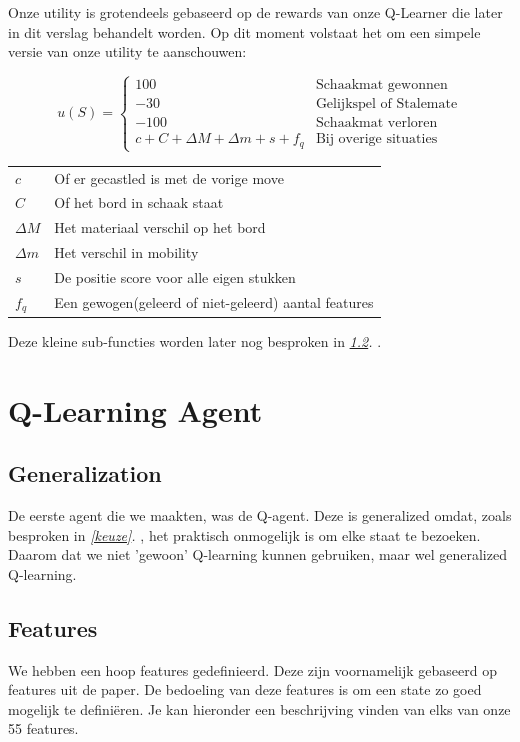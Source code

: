 \documentclass[a4paper,openany]{uantwerpenassignment}
\makeatletter
\newenvironment{conditions}
  {\par\vspace{\abovedisplayskip}\noindent\begin{tabular}{>{$}l<{$} @{${}={}$} l}}
  {\end{tabular}\par\vspace{\belowdisplayskip}}
\newcommand{\reference}[1]{\textit{\ref{#1}. \nameref{#1}}}
\makeatother
\begin{document}
Onze utility is grotendeels gebaseerd op de rewards van onze Q-Learner die later in dit verslag behandelt worden.
Op dit moment volstaat het om een simpele versie van onze utility te aanschouwen:


$$
u(S) = 
\begin{cases}
 100 &\mbox{Schaakmat gewonnen}\\
    -30 &\mbox{Gelijkspel of Stalemate}\\
    -100 &\mbox{Schaakmat verloren}\\
    c + C + \Delta M + \Delta m + s + f_q &\mbox{Bij overige situaties}
\end{cases}
$$

\begin{conditions}
    c & Of er gecastled is met de vorige move\\
    C & Of het bord in schaak staat\\
    \Delta M & Het materiaal verschil op het bord\\
    \Delta m & Het verschil in mobility\\
    s & De positie score voor alle eigen stukken\\
    f_q & Een gewogen(geleerd of niet-geleerd) aantal features
\end{conditions}

Deze kleine sub-functies worden later nog besproken in \reference{features}.

\chapter{Q-Learning Agent}

\section{Generalization}

De eerste agent die we maakten, was de Q-agent. Deze is generalized omdat, zoals besproken in \reference{keuze}, het praktisch onmogelijk is om elke staat te bezoeken. Daarom dat we niet 'gewoon' Q-learning kunnen gebruiken, maar wel generalized Q-learning.

\section{Features}
\label{features}

We hebben een hoop features gedefinieerd. Deze zijn voornamelijk gebaseerd op features uit de paper\cite{rl}. De bedoeling van deze features is om een state zo goed mogelijk te definiëren. Je kan hieronder een beschrijving vinden van elks van onze 55 features.
\end{document}
